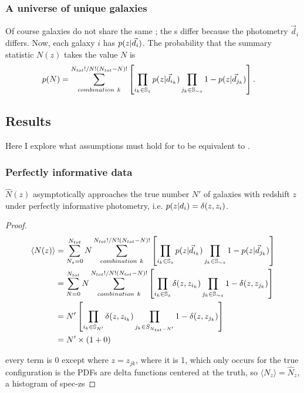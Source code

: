 \subsubsection{A universe of unique galaxies}

Of course galaxies do not share the same \pzpdf; the \pzpdf s differ because the photometry $\vec{d}_{i}$ differs.
Now, each galaxy $i$ has $p(z \vert \vec{d}_{i})$.
The probability that the summary statistic $N(z)$ takes the value $N$ is 
\begin{align}
\eqlabel{eq:general}
p(N) &= \sum_{combination\ k}^{N_{tot}! / N! (N_{tot} - N)!} \left[ \prod_{i_{k} \in \mathbb{S}_{z}} p(z \gvn \data_{i_{k}}) \prod_{j_{k} \in \mathbb{S}_{\sim z}} 1 - p(z \gvn \data_{j_{k}}) \right] .
\end{align}

\subsection{Results}

Here I explore what assumptions must hold for  to be equivalent to .

\subsubsection{Perfectly informative data}

\begin{theorem}
	$\hat{N}(z)$ asymptotically approaches the true number $N'$ of galaxies with redshift $z$ under perfectly informative photometry, i.e. $p(z \vert d_{i}) = \delta(z, z_{i})$.
\end{theorem}

\begin{proof}
\begin{align}
\label{eq:data}
\langle N(z) \rangle &= \sum_{N_{z} = 0}^{N_{tot}} N \sum_{combination\ k}^{N_{tot}! / N! (N_{tot} - N)!} \left[ \prod_{i_{k} \in \mathbb{S}_{z}} p(z \vert \vec{d}_{i_{k}}) \prod_{j_{k} \in \mathbb{S}_{\sim z}} 1 - p(z \vert \vec{d}_{j_{k}}) \right]\\
&= \sum_{N = 0}^{N_{tot}} N \sum_{combination\ k}^{N_{tot}! / N! (N_{tot} - N)!} \left[ \prod_{i_{k} \in \mathbb{S}_{z}} \delta(z, z_{i_{k}}) \prod_{j_{k} \in \mathbb{S}_{\sim z}} 1 - \delta(z, z_{j_{k}}) \right]\\
&= N' \left[ \prod_{i_{k} \in \mathbb{S}_{N'}} \delta(z, z_{i_{k}}) \prod_{j_{k} \in S_{N_{tot} -N'}} 1 - \delta(z, z_{j_{k}}) \right]\\
&= N' \times (1 + 0)\\
\end{align}

every term is 0 except where $z=z_{jk}$, where it is 1, which only occurs for the true configuration is the PDFs are delta functions centered at the truth, so $\langle N_{z}\rangle = \hat{N}_{z}$, a histogram of spec-zs
\end{proof}

